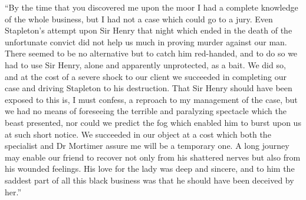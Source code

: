 \documentclass[paper=5.5in:8.5in,BCOR=7mm,twoside,DIV=calc,12pt,usegeometry,openany,chapterprefix,endperiod]{scrbook} %
\begin{document}
\enquote{By the time that you discovered me upon the moor I had a complete knowledge of the whole business, but I had not a case which could go to a jury. Even Stapleton's attempt upon Sir Henry that night which ended in the death of the unfortunate convict did not help us much in proving murder against our man. There seemed to be no alternative but to catch him red-handed, and to do so we had to use Sir Henry, alone and apparently unprotected, as a bait. We did so, and at the cost of a severe shock to our client we succeeded in completing our case and driving Stapleton to his destruction. That Sir Henry should have been exposed to this is, I must confess, a reproach to my management of the case, but we had no means of foreseeing the terrible and paralyzing spectacle which the beast presented, nor could we predict the fog which enabled him to burst upon us at such short notice. We succeeded in our object at a cost which both the specialist and Dr Mortimer assure me will be a temporary one. A long journey may enable our friend to recover not only from his shattered nerves but also from his wounded feelings. His love for the lady was deep and sincere, and to him the saddest part of all this black business was that he should have been deceived by her.}


\end{document}
